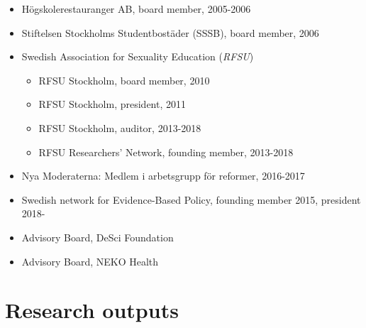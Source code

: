\documentclass[10pt]{article}
\begin{document}
\begin{itemize}[nolistsep]
\begin{itemize}[nolistsep]
	\end{itemize}
\item Högskolerestauranger AB, board member, 2005-2006
\item Stiftelsen Stockholms Studentbostäder (SSSB), board member, 2006
\item Swedish Association for Sexuality Education (\emph{RFSU})
	\begin{itemize}[nolistsep]
	\item RFSU Stockholm, board member, 2010
	\item RFSU Stockholm, president, 2011
	\item RFSU Stockholm, auditor, 2013-2018
	\item RFSU Researchers' Network, founding member, 2013-2018
	\end{itemize}
\item Nya Moderaterna: Medlem i arbetsgrupp för reformer, 2016-2017
\item Swedish network for Evidence-Based Policy, founding member 2015, president 2018-
\item Advisory Board, DeSci Foundation 
\item Advisory Board, NEKO Health
\end{itemize}

\newpage
\section*{Research outputs}


\end{document}
